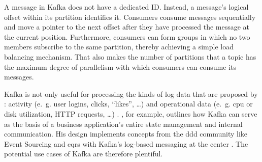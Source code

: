 A message in Kafka does not have a dedicated ID.
Instead, a message's logical offset within its partition identifies it.
Consumers consume messages sequentially and move a pointer to the next offset after they have processed the message at the current position.
Furthermore, consumers can form groups in which no two members subscribe to the same partition, thereby achieving a simple load balancing mechanism.
That also makes the number of partitions that a topic has the maximum degree of parallelism with which consumers can consume its messages.
\parencite{kreps_kafka_2011}

Kafka is not only useful for processing the kinds of log data that are proposed by \citeauthor{kreps_kafka_2011}: activity (e.~g. user logins, clicks, \enquote{likes}, \ldots) and operational data (e.~g. \gls{cpu} or disk utilization, HTTP requests, \ldots) \parencite{kreps_kafka_2011}.
\citeauthor{stopford_designing_2018}, for example, outlines how Kafka can serve as the basis of a business application's entire state management and internal communication.
His design implements concepts from the \gls{ddd} community like Event Sourcing \parencite{fowler_event_sourcing_2005} and \gls{cqrs} \parencite{fowler_cqrs_2011} with Kafka's log-based messaging at the center \parencite{stopford_designing_2018}.
The potential use cases of Kafka are therefore plentiful.
